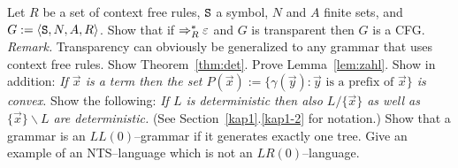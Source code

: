 \vplatz
\exercise
Let $R$ be a set of context free rules, $\mbox{\tt S}$ 
a symbol, $N$ and $A$ finite sets, and $G := 
\langle \mbox{\tt S}, N, A, R\rangle$. Show that if 
$\Rightarrow^{\ast}_R \varepsilon$ and $G$ is transparent 
then $G$ is a CFG. {\it Remark.} Transparency can 
obviously be generalized to any grammar that uses 
context free rules.
\vplatz
\exercise
Show Theorem~\ref{thm:det}.
\vplatz
\exercise
\label{ex:PN}
Prove Lemma~\ref{lem:zahl}. Show in addition: {\it If
$\vec{x}$ is a term then the set $P(\vec{x})
:= \{\gamma(\vec{y}) : \vec{y} \text{ is a prefix of }
\vec{x}\}$ is convex.}
\vplatz
\exercise
Show the following: {\it If $L$ is deterministic then also
$L/\{\vec{x}\}$ as well as $\{\vec{x}\}\backslash L$
are deterministic.} (See Section~\ref{kap1}.\ref{kap1-2} for notation.)
\vplatz
\exercise
Show that a grammar is an $LL(0)$--grammar if it generates
exactly one tree.
\vplatz
\exercise
Give an example of an NTS--language which is not an
$LR(0)$--language.
